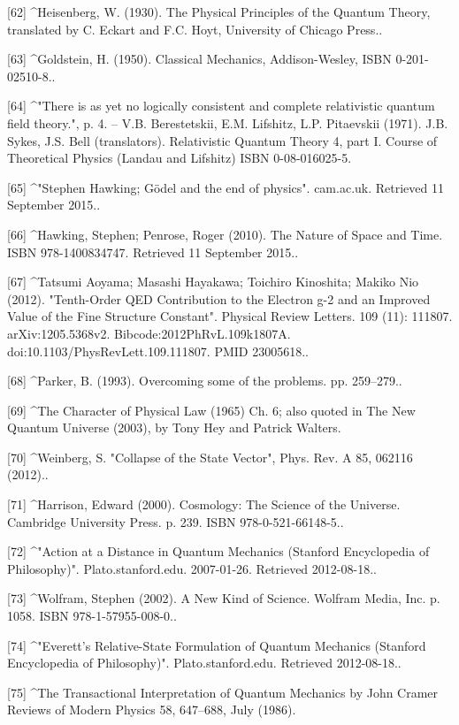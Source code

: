 [62]
^Heisenberg, W. (1930). The Physical Principles of the Quantum Theory, translated by C. Eckart and F.C. Hoyt, University of Chicago Press..

[63]
^Goldstein, H. (1950). Classical Mechanics, Addison-Wesley, ISBN 0-201-02510-8..

[64]
^"There is as yet no logically consistent and complete relativistic quantum field theory.", p. 4. – V.B. Berestetskii, E.M. Lifshitz, L.P. Pitaevskii (1971). J.B. Sykes, J.S. Bell (translators). Relativistic Quantum Theory 4, part I. Course of Theoretical Physics (Landau and Lifshitz) ISBN 0-08-016025-5.

[65]
^"Stephen Hawking; Gödel and the end of physics". cam.ac.uk. Retrieved 11 September 2015..

[66]
^Hawking, Stephen; Penrose, Roger (2010). The Nature of Space and Time. ISBN 978-1400834747. Retrieved 11 September 2015..

[67]
^Tatsumi Aoyama; Masashi Hayakawa; Toichiro Kinoshita; Makiko Nio (2012). "Tenth-Order QED Contribution to the Electron g-2 and an Improved Value of the Fine Structure Constant". Physical Review Letters. 109 (11): 111807. arXiv:1205.5368v2. Bibcode:2012PhRvL.109k1807A. doi:10.1103/PhysRevLett.109.111807. PMID 23005618..

[68]
^Parker, B. (1993). Overcoming some of the problems. pp. 259–279..

[69]
^The Character of Physical Law (1965) Ch. 6; also quoted in The New Quantum Universe (2003), by Tony Hey and Patrick Walters.

[70]
^Weinberg, S. "Collapse of the State Vector", Phys. Rev. A 85, 062116 (2012)..

[71]
^Harrison, Edward (2000). Cosmology: The Science of the Universe. Cambridge University Press. p. 239. ISBN 978-0-521-66148-5..

[72]
^"Action at a Distance in Quantum Mechanics (Stanford Encyclopedia of Philosophy)". Plato.stanford.edu. 2007-01-26. Retrieved 2012-08-18..

[73]
^Wolfram, Stephen (2002). A New Kind of Science. Wolfram Media, Inc. p. 1058. ISBN 978-1-57955-008-0..

[74]
^"Everett's Relative-State Formulation of Quantum Mechanics (Stanford Encyclopedia of Philosophy)". Plato.stanford.edu. Retrieved 2012-08-18..

[75]
^The Transactional Interpretation of Quantum Mechanics by John Cramer Reviews of Modern Physics 58, 647–688, July (1986).

